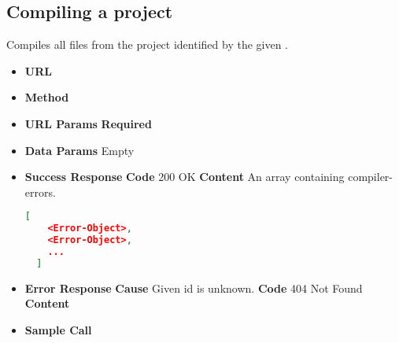 \subsection{Compiling a project}
Compiles all files from the project identified by the given .

\begin{itemize}
\item \textbf{URL} 
\item \textbf{Method} 

\item \textbf{URL Params}
  \newline\textbf{Required} 

\item \textbf{Data Params} Empty

\item \textbf{Success Response}
  \newline\textbf{Code} 200 OK
  \newline\textbf{Content} An array containing compiler-errors.
  \begin{lstlisting}[basicstyle=\small,language=json]
  [
    <Error-Object>,
    <Error-Object>,
    ...
  ]
  \end{lstlisting}
  
\item \textbf{Error Response}
  \newline\textbf{Cause} Given id is unknown.
  \newline\textbf{Code} 404 Not Found
  \newline\textbf{Content} 

\item \textbf{Sample Call}
\end{itemize}

